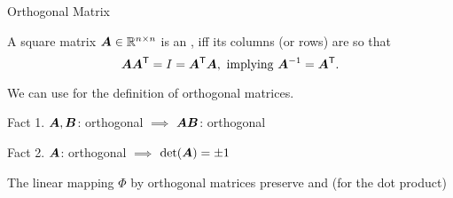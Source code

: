 \documentclass[fleqn,aspectratio=169]{beamer}
\begin{document}
\begin{frame}{Orthogonal Matrix}

\plitemsep 0.05in

\bci 

\item {} A square matrix $\bm{A} \in {\mathbb R}^{n \times n}$ is an , iff its columns (or rows) are  so that 
$$
\bm{A} {\bm{A}}^{\mathsf{T}} = I = {\bm{A}}^{\mathsf{T}}\bm{A}, \text{ implying } {{\bm{A}}^{-1}} = {\bm{A}}^{\mathsf{T}}.
$$
\vspace{-0.3cm}
\bci
\item We can use  for the definition of orthogonal matrices. 
\item Fact 1. $\bm{A},\bm{B}$: orthogonal $\implies$ $\bm{A}\bm{B}$: orthogonal
\item Fact 2. $\bm{A}$: orthogonal $\implies$ $\det(\bm{A}) = \pm 1$
\eci


\item The linear mapping $\Phi$ by orthogonal matrices preserve  and  (for the dot product)
\vspace{-0.7cm}

\eci
\end{frame}



\end{document}
